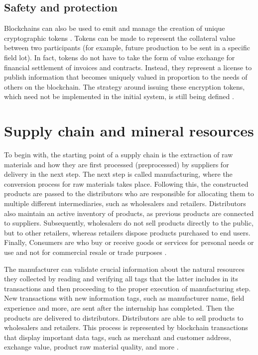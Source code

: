 \subsection{Safety and protection}\label{sec:Safety}
Blockchains can also be used to emit and manage the creation of unique cryptographic tokens \cite{nystrom1999pkcs}. Tokens can be made to represent the collateral value between two participants (for example, future production to be sent in a specific field lot). In fact, tokens do not have to take the form of value exchange for financial settlement of invoices and contracts. Instead, they represent a license to publish information that becomes uniquely valued in proportion to the needs of others on the blockchain. The strategy around issuing these encryption tokens, which need not be implemented in the initial system, is still being defined \cite{galvez2018future}.

\section{Supply chain and mineral resources}\label{sec:scmMineral}

To begin with, the starting point of a supply chain is the extraction of raw materials and how they are first processed (preprocessed) by suppliers for delivery in the next step. The next step is called manufacturing, where the conversion process for raw materials takes place. Following this, the constructed products are passed to the distributors who are responsible for allocating them to multiple different intermediaries, such as wholesalers and retailers. Distributors also maintain an active inventory of products, as previous products are connected to suppliers. Subsequently, wholesalers do not sell products directly to the public, but to other retailers, whereas retailers dispose products purchased to end users. Finally, Consumers are who buy or receive goods or services for personal needs or use and not for commercial resale or trade purposes \cite{litke2019blockchains}.

The manufacturer can validate crucial information about the natural resources they collected by reading and verifying all tags that the latter includes in its transactions and then proceeding to the proper execution of manufacturing step. New transactions with new information tags, such as manufacturer name, field experience and more, are sent after the internship has completed. Then the products are delivered to distributors. Distributors are able to sell products to wholesalers and retailers. This process is represented by blockchain transactions that display important data tags, such as merchant and customer address, exchange value, product raw material quality, and more \cite{sauer2018extending}. 

